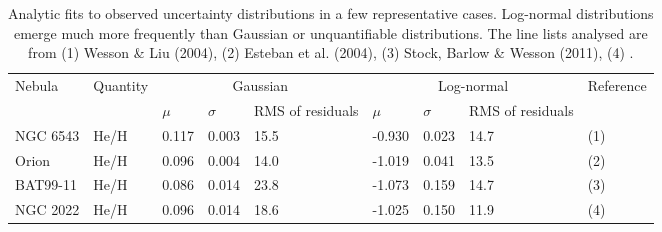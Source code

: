 \documentclass[useAMS,usenatbib]{mn2e}
\begin{document}
\begin{table}
\begin{tabular}{lllllllll}
\hline
Nebula & Quantity & \multicolumn{3}{c}{Gaussian} & \multicolumn{3}{c}{Log-normal} & Reference \\
       &          & $\mu$ & $\sigma$ & RMS of residuals & $\mu$ & $\sigma$ & RMS of residuals\\
\hline
NGC 6543 & He/H     & 0.117 & 0.003 & 15.5 & -0.930 & 0.023 & 14.7 & (1) \\
Orion    & He/H     & 0.096 & 0.004 & 14.0 & -1.019 & 0.041 & 13.5 & (2) \\
BAT99-11 & He/H     & 0.086 & 0.014 & 23.8 & -1.073 & 0.159 & 14.7 & (3) \\
NGC 2022 & He/H     & 0.096 & 0.014 & 18.6 & -1.025 & 0.150 & 11.9 & (4) \\
\hline
\end{tabular}
\caption{Analytic fits to observed uncertainty distributions in a few representative cases.  Log-normal distributions emerge much more frequently than Gaussian or unquantifiable distributions.  The line lists analysed are from (1) Wesson \& Liu (2004), (2) Esteban et al. (2004), (3) Stock, Barlow \& Wesson (2011), (4) \citet{2005A&A...436..953P}.}%
\label{Typical_uncertainties_table}
\end{table}
\end{document}
